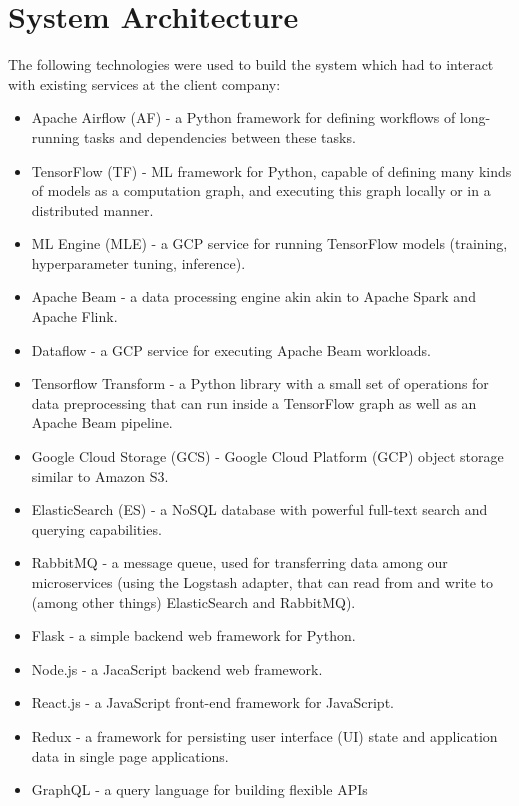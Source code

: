 \section{System Architecture}
\label{architecture}

 The following technologies were used to build the system which had to interact with existing services  at the client company:

\begin{itemize}
  \item Apache Airflow (AF) - a Python framework for defining workflows of long-running tasks and dependencies between these tasks.
  \item TensorFlow (TF) - ML framework for Python, capable of defining many kinds of models as a computation graph, and executing this graph locally or in a distributed manner.
  \item ML Engine (MLE) - a GCP service for running TensorFlow models (training, hyperparameter tuning, inference).
  \item Apache Beam - a data processing engine akin akin to Apache Spark and Apache Flink.
  \item Dataflow - a GCP service for executing Apache Beam workloads.
  \item Tensorflow Transform - a Python library with a small set of operations for data preprocessing that can run inside a TensorFlow graph as well as an Apache Beam pipeline.
  \item Google Cloud Storage (GCS) - Google Cloud Platform (GCP) object storage similar to Amazon S3.
  \item ElasticSearch (ES) - a NoSQL database with powerful full-text search and querying capabilities.
  \item RabbitMQ - a message queue, used for transferring data among our microservices (using the Logstash adapter, that can read from and write to (among other things) ElasticSearch and RabbitMQ).
  \item Flask - a simple backend web framework for Python.
  \item Node.js - a JacaScript backend web framework.
  \item React.js - a JavaScript front-end framework for JavaScript.
  \item Redux - a framework for persisting user interface (UI) state and application data in single page applications.
  \item GraphQL - a query language for building flexible APIs
\end{itemize}

